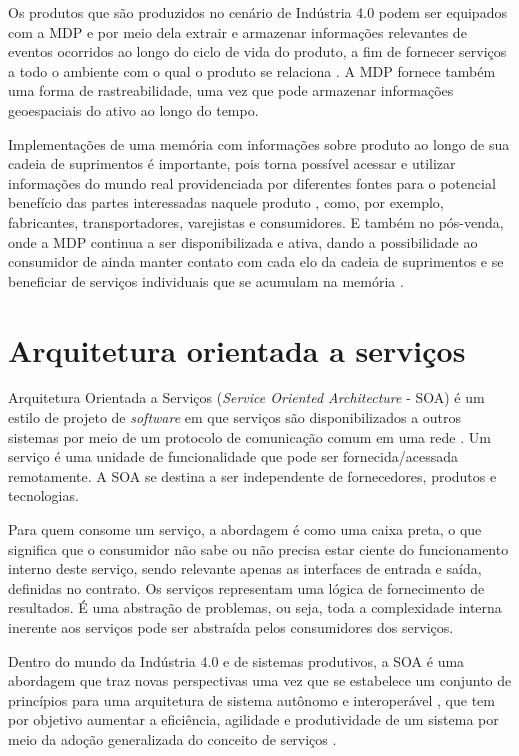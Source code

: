 Os produtos que são produzidos no cenário de Indústria 4.0 podem ser equipados com a MDP e por meio dela extrair e armazenar informações relevantes de eventos ocorridos ao longo do ciclo de vida do produto, a fim de fornecer serviços a todo o ambiente com o qual o produto se relaciona \cite{brandherm2011productmemory}. A MDP fornece também uma forma de rastreabilidade, uma vez que pode armazenar informações geoespaciais do ativo ao longo do tempo.

Implementações de uma memória com informações sobre produto ao longo de sua cadeia de suprimentos é importante, pois torna possível acessar e utilizar informações do mundo real providenciada por diferentes fontes para o potencial benefício das partes interessadas naquele produto \cite{brandherm2011productmemory}, como, por exemplo, fabricantes, transportadores, varejistas e consumidores. E também no pós-venda, onde a MDP continua a ser disponibilizada e ativa, dando a possibilidade ao consumidor de ainda manter contato com cada elo da cadeia de suprimentos e se beneficiar de serviços individuais que se acumulam na memória \cite{brandherm2011productmemory}.

\section{Arquitetura orientada a serviços}
\label{sec:webservices}

Arquitetura Orientada a Serviços (\textit{Service Oriented Architecture} - SOA) é um estilo de projeto de \textit{software} em que serviços são disponibilizados a outros sistemas por meio de um protocolo de comunicação comum em uma rede \cite{bell2008soa}. Um serviço é uma unidade de funcionalidade que pode ser fornecida/acessada remotamente. A SOA se destina a ser independente de fornecedores, produtos e tecnologias.

Para quem consome um serviço, a abordagem é como uma caixa preta, o que significa que o consumidor não sabe ou não precisa estar ciente do funcionamento interno deste serviço, sendo relevante apenas as interfaces de entrada e saída, definidas no contrato. Os serviços representam uma lógica de fornecimento de resultados. É uma abstração de problemas, ou seja, toda a complexidade interna inerente aos serviços pode ser abstraída pelos consumidores dos serviços.

Dentro do mundo da Indústria 4.0 e de sistemas produtivos, a SOA é uma abordagem que traz novas perspectivas uma vez que se estabelece um conjunto de princípios para uma arquitetura de sistema autônomo e interoperável \cite{candido2009soa}, que tem por objetivo aumentar a eficiência, agilidade e produtividade de um sistema por meio da adoção generalizada do conceito de serviços \cite{souit2013soa}.

